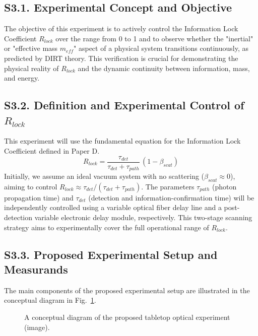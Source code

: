 \documentclass[a4paper,12pt]{article}
\begin{document}
\subsection*{S3.1. Experimental Concept and Objective}
\label{subsec:supp_exp_concept}

The objective of this experiment is to actively control the Information Lock Coefficient $R_{lock}$ over the range from 0 to 1 and to observe whether the "inertial" or "effective mass $m_{eff}$" aspect of a physical system transitions continuously, as predicted by DIRT theory. This verification is crucial for demonstrating the physical reality of $R_{lock}$ and the dynamic continuity between information, mass, and energy.

\subsection*{S3.2. Definition and Experimental Control of $R_{lock}$}
\label{subsec:supp_exp_rlock_control}

This experiment will use the fundamental equation for the Information Lock Coefficient defined in Paper D.
\begin{equation}
    R_{lock} = \frac{\tau_{det}}{\tau_{det}+\tau_{path}}\,(1-\beta_{scat})
    \label{eq:supp_rlock_experimental}
\end{equation}
Initially, we assume an ideal vacuum system with no scattering ($\beta_{scat} \approx 0$), aiming to control $R_{lock} \approx \tau_{det} / (\tau_{det}+\tau_{path})$. The parameters $\tau_{path}$ (photon propagation time) and $\tau_{det}$ (detection and information-confirmation time) will be independently controlled using a variable optical fiber delay line and a post-detection variable electronic delay module, respectively. This two-stage scanning strategy aims to experimentally cover the full operational range of $R_{lock}$.

\subsection*{S3.3. Proposed Experimental Setup and Measurands}
\label{subsec:supp_exp_setup_measurement}

The main components of the proposed experimental setup are illustrated in the conceptual diagram in Fig.~\ref{fig:supp_exp_setup_schematic}.

\begin{figure}[H]
    \centering
    \caption{A conceptual diagram of the proposed tabletop optical experiment (image).}
    \label{fig:supp_exp_setup_schematic}
\end{figure}
\end{document}
